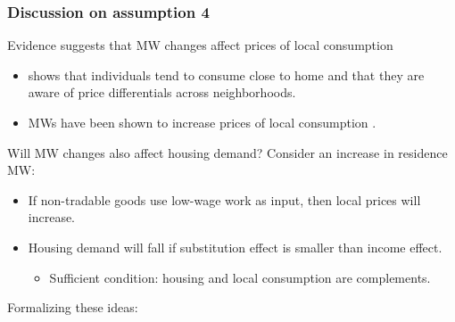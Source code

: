 \documentclass[aspectratio=169, t]{beamer}
\begin{document}
\begin{frame}[label = discuss4]
    \frametitle{Discussion on assumption 4}
    

	Evidence suggests that MW changes affect prices of local consumption
    \begin{itemize}
		\vspace{1mm}
        \item \textcite{MiyauchiEtAl2021} shows that individuals tend to consume close to home and that 
        they are aware of price differentials across neighborhoods.
		\vspace{1mm}
        \item MWs have been shown to increase prices of local consumption 
        \parencite[e.g.,][]{AllegrettoReich2018, LeungForthcoming}.
    \end{itemize}

    \pause 
    \vspace{2mm}

    Will MW changes also affect housing demand? Consider an increase in residence MW:
    \begin{itemize}
		\vspace{1mm}
        \item If non-tradable goods use low-wage work as input, then local prices will increase.
		\vspace{1mm}
		\item Housing demand will fall if substitution effect is smaller than income effect.
		\begin{itemize}
			\item Sufficient condition: housing and local consumption are complements.
		\end{itemize}
    \end{itemize}

	Formalizing these ideas: \hyperlink{microfound}{}  
\end{frame}
\end{document}
